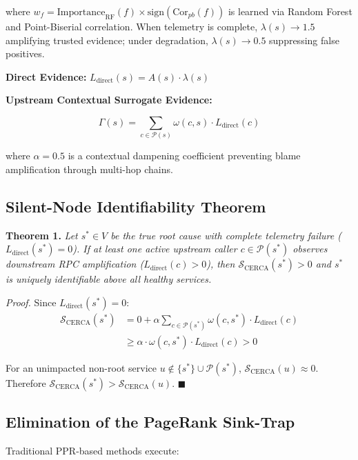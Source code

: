 \documentclass[conference]{IEEEtran}
\begin{document}
\noindent where $w_f = \text{Importance}_{\text{RF}}(f) \times \text{sign}(\text{Cor}_{pb}(f))$ is learned via Random Forest and Point-Biserial correlation. When telemetry is complete, $\lambda(s) \to 1.5$ amplifying trusted evidence; under degradation, $\lambda(s) \to 0.5$ suppressing false positives.

\noindent\textbf{Direct Evidence:}
$L_{\text{direct}}(s) = A(s) \cdot \lambda(s)$

\noindent\textbf{Upstream Contextual Surrogate Evidence:}

\begin{equation}
\Gamma(s) = \sum_{c \in \mathcal{P}(s)} \omega(c, s) \cdot L_{\text{direct}}(c)
\label{eq:gamma}
\end{equation}

\noindent where $\alpha = 0.5$ is a contextual dampening coefficient preventing blame amplification through multi-hop chains.

\subsection{Silent-Node Identifiability Theorem}

\textbf{Theorem 1.} \textit{Let $s^* \in V$ be the true root cause with complete telemetry failure ($L_{\text{direct}}(s^*) = 0$). If at least one active upstream caller $c \in \mathcal{P}(s^*)$ observes downstream RPC amplification ($L_{\text{direct}}(c) > 0$), then $\mathcal{S}_{\text{CERCA}}(s^*) > 0$ and $s^*$ is uniquely identifiable above all healthy services.}

\textit{Proof.} Since $L_{\text{direct}}(s^*) = 0$:
\begin{align}
\mathcal{S}_{\text{CERCA}}(s^*) &= 0 + \alpha \!\!\sum_{c \in \mathcal{P}(s^*)} \omega(c, s^*) \cdot L_{\text{direct}}(c) \nonumber \\
&\geq \alpha \cdot \omega(c, s^*) \cdot L_{\text{direct}}(c) > 0
\end{align}

For an unimpacted non-root service $u \notin \{s^*\} \cup \mathcal{P}(s^*)$, $\mathcal{S}_{\text{CERCA}}(u) \approx 0$. Therefore $\mathcal{S}_{\text{CERCA}}(s^*) > \mathcal{S}_{\text{CERCA}}(u)$. $\blacksquare$

\subsection{Elimination of the PageRank Sink-Trap}

Traditional PPR-based methods \cite{wu2020, wang2018} execute:
\end{document}
